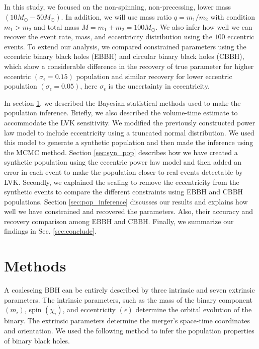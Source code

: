 \documentclass[twocolumn,prd,nofootinbib]{revtex4}
\newcommand\AddedResponse[1]{{\color{blue} {#1}}}
\begin{document}
In this study, we focused on the non-spinning, non-precessing, lower mass $(10 M_\odot - 50 M_\odot)$.
In addition, we will use mass ratio $q = m_1 / m_2 $ with condition 
$m_1>m_2$ and total mass $M = m_1 + m_2 = 100 M_\odot$. We also infer how well we can recover the event rate, mass, 
and eccentricity distribution using the $100$ eccentric events. To extend our analysis, we compared 
constrained parameters using the eccentric binary black holes (EBBH) and circular binary black holes (CBBH), which show a considerable difference in the recovery of true parameter
for higher eccentric $(\sigma_\epsilon = 0.15)$ population and similar recovery for
\AddedResponse{
lower eccentric population $(\sigma_\epsilon = 0.05)$, here $\sigma_\epsilon$ is the uncertainty in eccentricity.}


In section \ref{sec:methods}, we described the Bayesian statistical methods used to make the population 
inference. Briefly, we also described the volume-time estimate to accommodate the LVK sensitivity. We 
modified the previously constructed \cite{fishbach-2017,2018talbot_bbh_model} 
power law model to include eccentricity using a truncated normal distribution. We used 
this model to generate a synthetic population and then made 
the inference using the MCMC method. Section \ref{sec:syn_pop} describes how we have created a synthetic population using
the eccentric power law model and then added an error in each event to make the population closer to real events 
detectable by LVK. Secondly, we explained the scaling to remove the eccentricity from the synthetic events 
to compare the different constraints using EBBH and CBBH populations. Section \ref{sec:pop_inference} discusses 
our results and explains how well we have constrained and recovered the parameters. Also, their accuracy and 
recovery comparison among EBBH and CBBH. Finally, we summarize our findings in Sec. \ref{sec:conclude}.

\section{Methods}
\label{sec:methods}

A coalescing BBH can be entirely described by three intrinsic and seven extrinsic parameters. The intrinsic
parameters, such as the mass of the binary component $(m_i)$, spin $(\chi_i)$, and eccentricity $(\epsilon)$  
determine the orbital evolution of the binary. The extrinsic parameters determine the merger's space-time 
coordinates and orientation. We used the following method to infer the population properties of binary black 
holes.
\end{document}
